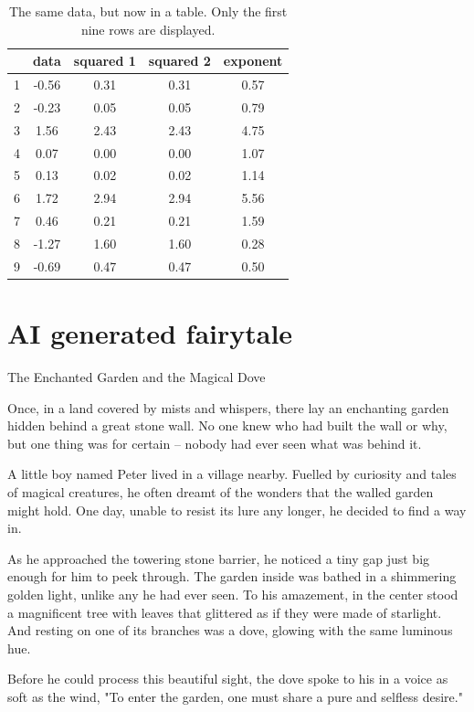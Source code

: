 \documentclass[10pt, fullpage, a4paper, titlepage]{article}
\begin{document}
 \begin{table}[h]
\centering
\caption{The same data, but now in a table. Only the first nine rows are displayed.}
\label{tab:my-table}
\begin{tabular}{@{}ccccc@{}}
\toprule
  & data  & squared 1 & squared 2 & exponent \\ \midrule
1 & -0.56 & 0.31      & 0.31      & 0.57     \\
2 & -0.23 & 0.05      & 0.05      & 0.79     \\
3 & 1.56  & 2.43      & 2.43      & 4.75     \\
4 & 0.07  & 0.00      & 0.00      & 1.07     \\ 
5 & 0.13  & 0.02      & 0.02      & 1.14     \\
6 & 1.72  & 2.94      & 2.94      & 5.56     \\
7 & 0.46  & 0.21      & 0.21      & 1.59     \\
8 & -1.27 & 1.60      & 1.60      & 0.28     \\
9 & -0.69 & 0.47      & 0.47      & 0.50    
\end{tabular}
\end{table}

\newpage
\section{AI generated fairytale}
The Enchanted Garden and the Magical Dove

Once, in a land covered by mists and whispers, there lay an enchanting garden hidden behind a great stone wall. No one knew who had built the wall or why, but one thing was for certain – nobody had ever seen what was behind it.

A little boy named Peter lived in a village nearby. Fuelled by curiosity and tales of magical creatures, he often dreamt of the wonders that the walled garden might hold. One day, unable to resist its lure any longer, he decided to find a way in.

As he approached the towering stone barrier, he noticed a tiny gap just big enough for him to peek through. The garden inside was bathed in a shimmering golden light, unlike any he had ever seen. To his amazement, in the center stood a magnificent tree with leaves that glittered as if they were made of starlight. And resting on one of its branches was a dove, glowing with the same luminous hue.

Before he could process this beautiful sight, the dove spoke to his in a voice as soft as the wind, "To enter the garden, one must share a pure and selfless desire."
\end{document}
